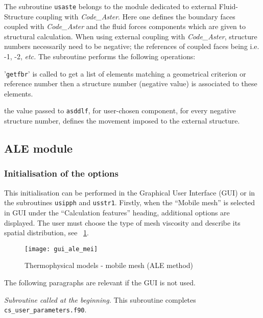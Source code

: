 {{{The subroutine \texttt{usaste} belongs to the module dedicated to external
 Fluid-Structure coupling with \textit{Code\_Aster}. Here one defines the boundary
 faces coupled with \textit{Code\_Aster} and the fluid forces components which are
 given to structural calculation. When using external coupling with \textit{Code\_Aster},
 structure numbers necessarily need to be negative; the references of coupled faces being
 i.e. -1, -2, \emph{etc.}
The subroutine performs the following operations:
\begin{list}{-}{}
 \item '\texttt{getfbr}' is called to get a list of elements matching a
geometrical criterion or reference number then a structure number (negative value) is associated
 to these elements.
 \item the value passed to \texttt{asddlf}, for user-chosen component, for every negative
 structure number, defines the movement imposed to the external structure.
\end{list}
%
\clearpage
%
\subsection{ALE module}
\subsubsection{Initialisation of the options}
This initialisation can be performed in the Graphical User Interface (GUI)
 or in the subroutines \texttt{usipph} and \texttt{usstr1}. Firstly,
 when the ``Mobile mesh'' is selected in GUI under the ``Calculation features''
 heading, additional options are displayed. The user must choose the type of mesh
 viscosity and describe its spatial distribution, see \figurename~\ref{fig:Ini-ale}.
%
\begin{figure}[!ht]
\begin{center}
\texttt{[image: gui\_ale\_mei]}
\caption{Thermophysical models - mobile mesh (ALE method)}
\label{fig:Ini-ale}
\end{center}
\end{figure}
%
The following paragraphs are relevant if the GUI is not used.

\noindent
\textit{Subroutine called at the beginning.}
This subroutine completes \texttt{cs\_user\_parameters.f90}.

}}}
